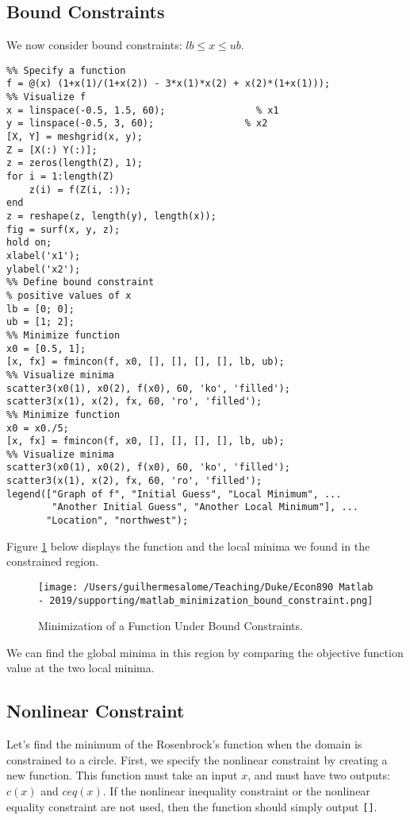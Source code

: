 \documentclass[12pt, a4paper]{article}
\begin{document}
\subsection{Bound Constraints}
\label{sec:orgc11850b}
We now consider bound constraints: \({lb}\leq x\leq {ub}\).
\lstset{language=matlab,label= ,caption= ,captionpos=b,firstnumber=1,numbers=left,style=Matlab-editor}
\begin{lstlisting}
%% Specify a function
f = @(x) (1+x(1)/(1+x(2)) - 3*x(1)*x(2) + x(2)*(1+x(1)));
%% Visualize f
x = linspace(-0.5, 1.5, 60);                % x1
y = linspace(-0.5, 3, 60);                % x2
[X, Y] = meshgrid(x, y);
Z = [X(:) Y(:)];
z = zeros(length(Z), 1);
for i = 1:length(Z)
    z(i) = f(Z(i, :));
end
z = reshape(z, length(y), length(x));
fig = surf(x, y, z);
hold on;
xlabel('x1');
ylabel('x2');
%% Define bound constraint
% positive values of x
lb = [0; 0];
ub = [1; 2];
%% Minimize function
x0 = [0.5, 1];
[x, fx] = fmincon(f, x0, [], [], [], [], lb, ub);
%% Visualize minima
scatter3(x0(1), x0(2), f(x0), 60, 'ko', 'filled');
scatter3(x(1), x(2), fx, 60, 'ro', 'filled');
%% Minimize function
x0 = x0./5;
[x, fx] = fmincon(f, x0, [], [], [], [], lb, ub);
%% Visualize minima
scatter3(x0(1), x0(2), f(x0), 60, 'ko', 'filled');
scatter3(x(1), x(2), fx, 60, 'ro', 'filled');
legend(["Graph of f", "Initial Guess", "Local Minimum", ...
        "Another Initial Guess", "Another Local Minimum"], ...
       "Location", "northwest");
\end{lstlisting}

Figure \ref{fig:orgf804ef8} below displays the function and the local minima we found in the constrained region.
\begin{figure}[H]
\centering
\texttt{[image: /Users/guilhermesalome/Teaching/Duke/Econ890 Matlab - 2019/supporting/matlab\_minimization\_bound\_constraint.png]}
\caption{\label{fig:orgf804ef8}
Minimization of a Function Under Bound Constraints.}
\end{figure}
We can find the global minima in this region by comparing the objective function value at the two local minima.
\subsection{Nonlinear Constraint}
\label{sec:orga1a2222}
Let's find the minimum of the Rosenbrock's function when the domain is constrained to a circle.
First, we specify the nonlinear constraint by creating a new function.
This function must take an input \(x\), and must have two outputs: \(c(x)\) and \({ceq}(x)\).
If the nonlinear inequality constraint or the nonlinear equality constraint are not used, then the function should simply output \texttt{[]}.
\end{document}
